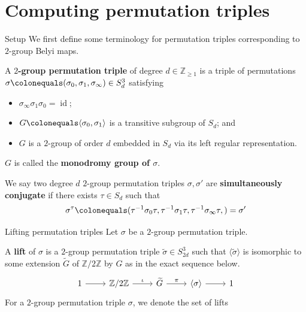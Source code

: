 \documentclass[handout,xcolor=dvipsnames]{beamer}
\theoremstyle{plain}
\newcommand{\ZZ}{\mathbb Z}
\newcommand{\wt}[1]{\widetilde{#1}}
\DeclareMathOperator{\id}{id}
\begin{document}
  \section{Computing permutation triples}{
    \begin{frame}{Setup}
      We first define some terminology for
      permutation triples corresponding
      to $2$-group Belyi maps.
      \pause\par
      A \textbf{$2$-group permutation triple}
      of degree $d\in\ZZ_{\geq 1}$ is a triple
      of permutations
      $\sigma\colonequals(\sigma_0,\sigma_1,\sigma_\infty)
      \in S_d^3$ satisfying
      \begin{itemize}
        \item
          $\sigma_\infty\sigma_1\sigma_0=\id$;
        \item
          $G\colonequals\langle\sigma_0,\sigma_1\rangle$
          is a transitive subgroup of $S_d$; and
        \item
          $G$ is a $2$-group of order $d$
          embedded in $S_d$
          via its left regular representation.
      \end{itemize}
      \pause
      $G$ is called the \textbf{monodromy group of $\sigma$}.
      \pause\par
      We say two degree $d$
      $2$-group permutation triples $\sigma,\sigma'$
      are \textbf{simultaneously conjugate} if there exists
      $\tau\in S_d$ such that
      \[
        \sigma^\tau\colonequals
        (
          \tau^{-1}\sigma_0\tau,
          \tau^{-1}\sigma_1\tau,
          \tau^{-1}\sigma_\infty\tau,
        )
        =\sigma'
      \]
    \end{frame}
    \begin{frame}[fragile]{Lifting permutation triples}
      Let $\sigma$ be a $2$-group permutation triple.
      \pause\par
      A \textbf{lift} of $\sigma$ is
      a $2$-group permutation triple
      $\wt{\sigma}\in S_{2d}^3$
      such that
      $\langle\wt{\sigma}\rangle$
      is isomorphic to some extension
      $\wt{G}$
      of $\ZZ/2\ZZ$ by $G$
      as in the exact sequence below.
      \[
        \begin{tikzcd}
          1\arrow{r}&\ZZ/2\ZZ\arrow{r}{\iota}
                    &\wt{G}\arrow{r}{\pi}
                    &\langle\sigma\rangle\arrow{r}
                    &1
        \end{tikzcd}
      \]
      \pause
      For a $2$-group permutation triple
      $\sigma$, we denote the set of lifts

\end{frame}}
\end{document}
